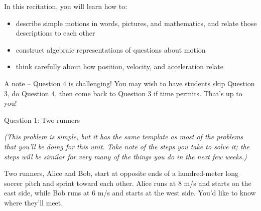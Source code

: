 \documentclass[12pt]{article}
\newcommand{\BI}{\begin{itemize}}
\newcommand{\EI}{\end{itemize}}
\def\BS{\bigskip}
\begin{document}
\Large
\centerline{}
\normalsize
\centerline{}
\normalsize
\medskip

\BS\BS\BS


In this recitation, you will learn how to:

\BI
\item describe simple motions in words, pictures, and mathematics, and relate those descriptions to each other
\item construct algebraic representations of questions about motion
\item think carefully about how position, velocity, and acceleration relate
\EI


{\color{Red}A note -- Question 4 is challenging! You may wish to have students skip Question 3, do Question 4, then come back to Question 3 if time permits. That's up to you!}

\centerline{\Large Question 1: Two runners}

\begin{center}
\it (This problem is simple, but it has the same template as most of the problems that you'll be doing for this unit. Take note of the steps you take to solve it; the steps will be similar for very many of the things you do in the next few weeks.)

\end{center}
\rm
Two runners, Alice and Bob, start at opposite ends of a hundred-meter long soccer pitch and sprint toward each other. Alice runs at 8 m/s and starts on the east side, while Bob runs at 6 m/s and starts at the west side. You'd like to know where they'll meet.
\end{document}
